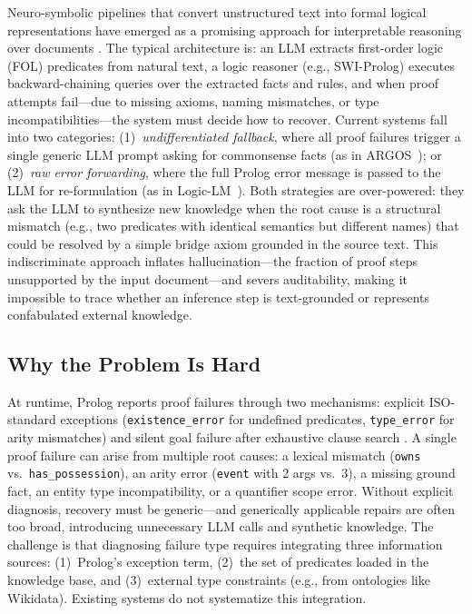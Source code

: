 \documentclass[11pt,letterpaper]{article}
\begin{document}
Neuro-symbolic pipelines that convert unstructured text into formal logical representations have emerged as a promising approach for interpretable reasoning over documents \citep{Pan2023, Han2022}. The typical architecture is: an LLM extracts first-order logic (FOL) predicates from natural text, a logic reasoner (e.g., SWI-Prolog) executes backward-chaining queries over the extracted facts and rules, and when proof attempts fail---due to missing axioms, naming mismatches, or type incompatibilities---the system must decide how to recover. Current systems fall into two categories: (1)~\emph{undifferentiated fallback}, where all proof failures trigger a single generic LLM prompt asking for commonsense facts (as in ARGOS~\citep{Cotnareanu2026}); or (2)~\emph{raw error forwarding}, where the full Prolog error message is passed to the LLM for re-formulation (as in Logic-LM~\citep{Pan2023}). Both strategies are over-powered: they ask the LLM to synthesize new knowledge when the root cause is a structural mismatch (e.g., two predicates with identical semantics but different names) that could be resolved by a simple bridge axiom grounded in the source text. This indiscriminate approach inflates hallucination---the fraction of proof steps unsupported by the input document---and severs auditability, making it impossible to trace whether an inference step is text-grounded or represents confabulated external knowledge.

\subsection{Why the Problem Is Hard}

At runtime, Prolog reports proof failures through two mechanisms: explicit ISO-standard exceptions (\texttt{existence\_error} for undefined predicates, \texttt{type\_error} for arity mismatches) and silent goal failure after exhaustive clause search \citep{SWIProlog}. A single proof failure can arise from multiple root causes: a lexical mismatch (\texttt{owns} vs.\ \texttt{has\_possession}), an arity error (\texttt{event} with 2 args vs.\ 3), a missing ground fact, an entity type incompatibility, or a quantifier scope error. Without explicit diagnosis, recovery must be generic---and generically applicable repairs are often too broad, introducing unnecessary LLM calls and synthetic knowledge. The challenge is that diagnosing failure type requires integrating three information sources: (1)~Prolog's exception term, (2)~the set of predicates loaded in the knowledge base, and (3)~external type constraints (e.g., from ontologies like Wikidata). Existing systems do not systematize this integration.
\end{document}
